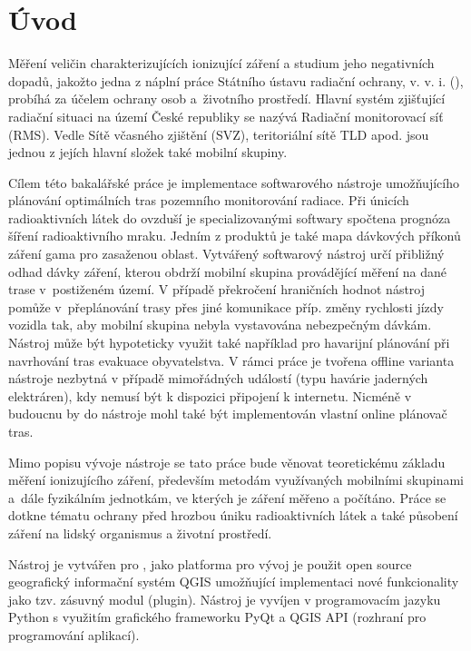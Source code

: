\chapter{Úvod}
\label{1-uvod}
Měření veličin charakterizujících ionizující záření a studium jeho negativních dopadů, jakožto jedna z náplní práce Státního ústavu radiační ochrany, v. v. i. (), probíhá za účelem ochrany osob a~životního prostředí. %
Hlavní systém zjišťující radiační situaci na území České republiky se nazývá Radiační monitorovací síť (RMS). Vedle Sítě včasného zjištění (SVZ), teritoriální sítě TLD apod. jsou jednou z jejích hlavní složek také mobilní skupiny.

Cílem této bakalářské práce je implementace softwarového nástroje umožňujícího plánování optimálních tras pozemního monitorování radiace. Při únicích radioaktivních látek do ovzduší je specializovanými softwary spočtena prognóza šíření radioaktivního mraku. Jedním z produktů je také mapa dávkových příkonů záření gama pro zasaženou oblast. Vytvářený softwarový nástroj určí přibližný odhad dávky záření, kterou obdrží mobilní skupina provádějící měření na dané trase v~postiženém území. V případě překročení hraničních hodnot nástroj pomůže v~přeplánování trasy přes jiné komunikace příp. změny rychlosti jízdy vozidla tak, aby mobilní skupina nebyla vystavována nebezpečným dávkám. 
Nástroj může být hypoteticky využit také například pro havarijní plánování při navrhování tras evakuace obyvatelstva. V rámci práce je tvořena offline varianta nástroje nezbytná v případě mimořádných událostí (typu havárie jaderných elektráren), kdy nemusí být k dispozici připojení k internetu. Nicméně v budoucnu by do nástroje mohl také být implementován vlastní online plánovač tras. 

Mimo popisu vývoje nástroje se tato práce bude věnovat teoretickému základu měření ionizujícího záření, především metodám využívaných mobilními skupinami a~dále fyzikálním jednotkám, ve kterých je záření měřeno a počítáno. Práce se  dotkne tématu ochrany před hrozbou úniku radioaktivních látek a také působení záření na lidský organismus a životní prostředí.

Nástroj je vytvářen pro , jako platforma pro vývoj je použit open source geografický informační systém QGIS umožňující implementaci nové funkcionality jako tzv. zásuvný modul (plugin). Nástroj je vyvíjen v programovacím jazyku Python s využitím grafického frameworku PyQt a QGIS API (rozhraní pro programování aplikací).    






